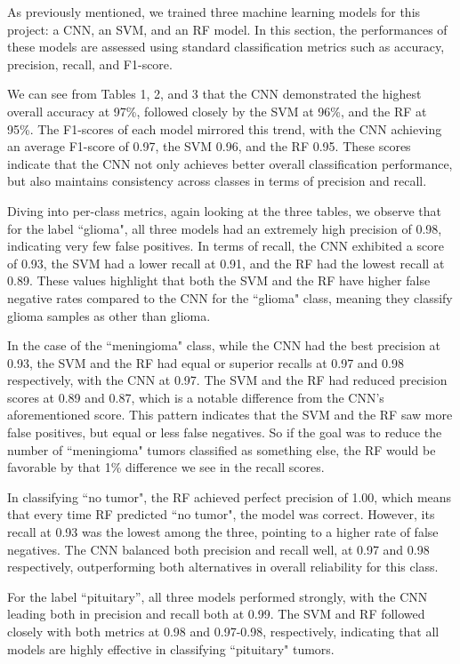 \documentclass[conference]{IEEEtran}
\begin{document}
As previously mentioned, we trained three machine learning models for this project: a CNN, an SVM, and an RF model. In this section, the performances of these models are assessed using standard classification metrics such as accuracy, precision, recall, and F1-score. 

\vspace{1.5em}

We can see from Tables 1, 2, and 3 that the CNN demonstrated the highest overall accuracy at 97\%, followed closely by the SVM at 96\%, and the RF at 95\%. The F1-scores of each model mirrored this trend, with the CNN achieving an average F1-score of 0.97, the SVM 0.96, and the RF 0.95. These scores indicate that the CNN not only achieves better overall classification performance, but also maintains consistency across classes in terms of precision and recall.

Diving into per-class metrics, again looking at the three tables, we observe that for the label ``glioma", all three models had an extremely high precision of 0.98, indicating very few false positives. In terms of recall, the CNN exhibited a score of 0.93, the SVM had a lower recall at 0.91, and the RF had the lowest recall at 0.89. These values highlight that both the SVM and the RF have higher false negative rates compared to the CNN for the ``glioma" class, meaning they classify glioma samples as other than glioma.

In the case of the ``meningioma" class, while the CNN had the best precision at 0.93, the SVM and the RF had equal or superior recalls at 0.97 and 0.98 respectively, with the CNN at 0.97. The SVM and the RF had reduced precision scores at 0.89 and 0.87, which is a notable difference from the CNN's aforementioned score. This pattern indicates that the SVM and the RF saw more false positives, but equal or less false negatives. So if the goal was to reduce the number of ``meningioma" tumors classified as something else, the RF would be favorable by that 1\% difference we see in the recall scores. 

In classifying ``no tumor", the RF achieved perfect precision of 1.00, which means that every time RF predicted ``no tumor", the model was correct. However, its recall at 0.93 was the lowest among the three, pointing to a higher rate of false negatives. The CNN balanced both precision and recall well, at 0.97 and 0.98 respectively, outperforming both alternatives in overall reliability for this class.

For the label ``pituitary'', all three models performed strongly, with the CNN leading both in precision and recall both at 0.99. The SVM and RF followed closely with both metrics at 0.98 and 0.97-0.98, respectively, indicating that all models are highly effective in classifying ``pituitary" tumors.
\end{document}
